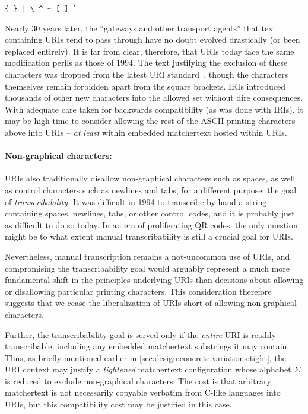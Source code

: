 \begin{center}
\verb|{ } |\texttt{|}\verb| \ ^ ~ [ ] `|
\end{center}

Nearly 30 years later,
the ``gateways and other transport agents'' that text containing URIs
tend to pass through have no doubt evolved drastically
(or been replaced entirely).
It is far from clear, therefore,
that URIs today face the same modification perils as those of 1994.
The text justifying the exclusion of these characters
was dropped from the latest URI standard~\cite{rfc3986},
though the characters themselves remain forbidden
apart from the square brackets.
IRIs introduced thousands of other new characters into the allowed set
without dire consequences.
With adequate care taken for backwards compatibility (as was done with IRIs),
it may be high time to consider allowing
the rest of the ASCII printing characters above into URIs --
\emph{at least} within embedded matchertext hosted within URIs.

\paragraph{Non-graphical characters:}

URIs also traditionally disallow non-graphical characters such as spaces,
as well as control characters such as newlines and tabs,
for a different purpose: the goal of \emph{transcribability}.
It was difficult in 1994 to transcribe by hand
a string containing spaces, newlines, tabs, or other control codes,
and it is probably just as difficult to do so today.
In an era of proliferating QR codes,
the only question might be to what extent manual transcribability
is still a crucial goal for URIs.

Nevertheless, manual transcription remains a not-uncommon use of URIs,
and compromising the transcribability goal
would arguably represent a much more fundamental shift
in the principles underlying URIs
than decisions about allowing or disallowing particular printing characters.
This consideration therefore suggests that we
cease the liberalization of URIs short of
allowing non-graphical characters.

Further, the transcribability goal is served
only if the \emph{entire} URI is readily transcribable,
including any embedded matchertext substrings it may contain.
Thus,
as briefly mentioned earlier in \cref{sec:design:concrete:variations:tight},
the URI context may justify a \emph{tightened} matchertext configuration
whose alphabet $\Sigma$ is reduced to exclude non-graphical characters.
The cost is that arbitrary matchertext is not necessarily copyable verbatim
from C-like languages into URIs,
but this compatibility cost may be justified in this case.


